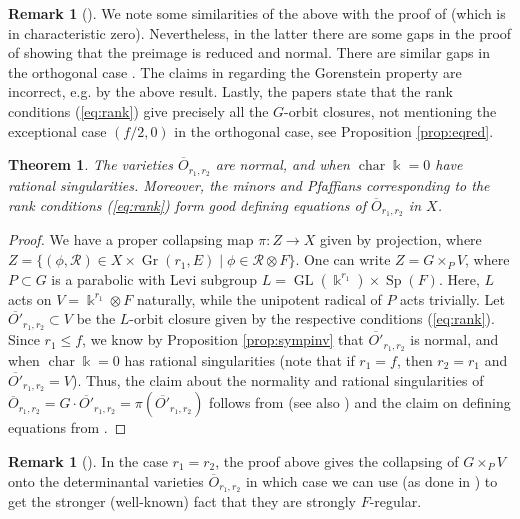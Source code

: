 \documentclass[11pt]{amsart}
\numberwithin{equation}{section}
\newtheorem{theorem}[equation]{Theorem}
\theoremstyle{definition}
\newtheorem{rmk}[equation]{Remark}
\newenvironment{remark}[1][]{\begin{rmk}[#1] \pushQED{\qed}}{\popQED \end{rmk}}
\DeclareMathOperator{\GL}{GL}
\DeclareMathOperator{\Sp}{Sp}
\DeclareMathOperator{\cha}{char}
\newcommand{\op}{\operatorname}
\newcommand{\oo}{\otimes}
\newcommand{\mc}{\mathcal}
\newcommand{\ol}{\overline}
\newcommand{\kk}{\Bbbk}
\begin{document}
\begin{remark}\label{rem:errors}
We note some similarities of the above with the proof of \cite[Theorem 4.6]{lovett05} (which is in characteristic zero). Nevertheless, in the latter there are some gaps in the proof of showing that the preimage is reduced and normal. There are similar gaps in the orthogonal case \cite[Theorems 4.9 and 4.10]{lovett05}. The claims in \cite[Proposition 4.3]{lovett07} regarding the Gorenstein property are incorrect, e.g. by the above result. Lastly, the papers \cite{lovett05, lovett07} state that the rank conditions (\ref{eq:rank}) give precisely all the $G$-orbit closures, not mentioning the exceptional case $(f/2,0)$ in the orthogonal case, see Proposition \ref{prop:eqred}.
\end{remark}

\begin{theorem}\label{thm:mainsymp}
The varieties $\ol{O}_{r_1, r_2}$ are normal, and when $\cha \kk =0$ have rational singularities. Moreover, the minors and Pfaffians corresponding to the rank conditions (\ref{eq:rank}) form good defining equations of $\ol{O}_{r_1, r_2}$ in $X$.
\end{theorem}

\begin{proof}
We have a proper collapsing map $\pi: Z \to X$ given by projection, where $Z=\{(\phi, \mc{R}) \in X \times \op{Gr}(r_1,E) \mid \phi \in \mc{R}\oo F\}$. One can write $Z=G\times_P V$, where $P\subset G$ is a parabolic with Levi subgroup $L=\GL(\kk^{r_1})\times \Sp(F)$. Here, $L$ acts on $V=\kk^{r_1}\oo F$ naturally, while the unipotent radical of $P$ acts trivially. Let $\ol{O'}_{r_1,r_2} \subset V$ be the $L$-orbit closure given by the respective conditions (\ref{eq:rank}). Since $r_1\leq f$, we know by Proposition \ref{prop:sympinv} that $\ol{O'}_{r_1,r_2}$ is normal, and when $\cha \kk = 0$ has rational singularities (note that if $r_1=f$, then $r_2=r_1$ and  $\ol{O'}_{r_1,r_2}= V$).
Thus, the claim about the normality and rational singularities of $\ol{O}_{r_1,r_2}=G \cdot \ol{O'}_{r_1,r_2} = \pi(\ol{O'}_{r_1,r_2})$ follows from \cite[Theorems 1.3 and 1.4]{me} (see also \cite{kempf76}) and the claim on defining equations from \cite[Theorem 1.5]{me}.
\end{proof}

\begin{remark}
In the case $r_1=r_2$, the proof above gives the collapsing of $G\times_P V$ onto the determinantal varieties $\ol{O}_{r_1,r_2}$ in which case we can use  \cite[Theorems 1.2 and 1.3]{me}  (as done in \cite[Section 4.1]{me}) to get the stronger (well-known) fact that they are strongly $F$-regular.
\end{remark}
\end{document}
